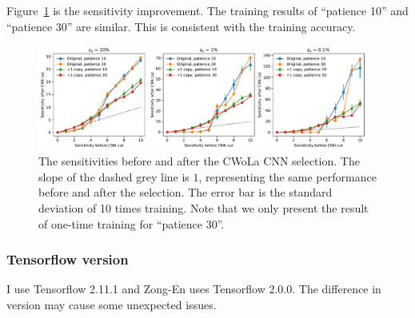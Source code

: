 \documentclass[12pt]{article}
\begin{document}
            Figure~\ref{fig:sensitivity_improvement_bkg_eff_patience_30} is the sensitivity improvement. The training results of ``patience 10'' and ``patience 30'' are similar. This is consistent with the training accuracy.
            \begin{figure}[htpb]
                \centering
                \includegraphics[width=0.97\textwidth]{HVmodel_sensitivity_improvement_bkg_eff_origin_copy_1_patience_30.pdf}
                \caption{The sensitivities before and after the CWoLa CNN selection. The slope of the dashed grey line is $1$, representing the same performance before and after the selection. The error bar is the standard deviation of 10 times training. Note that we only present the result of one-time training for ``patience 30''.}
                \label{fig:sensitivity_improvement_bkg_eff_patience_30}
            \end{figure}
        \subsubsection{Tensorflow version}%
        \label{subs:tensorflow_version}
            I use Tensorflow 2.11.1 and Zong-En uses Tensorflow 2.0.0. The difference in version may cause some unexpected issues.
\end{document}
